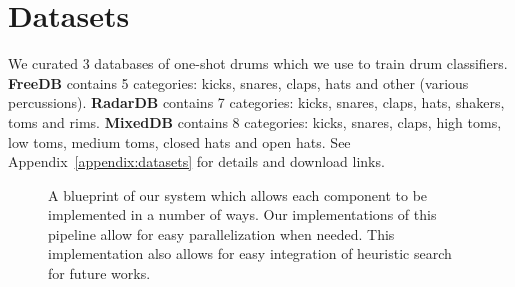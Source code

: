 \documentclass[runningheads,a4paper]{llncs}
\begin{document}
\section{Datasets}
We curated 3 databases of one-shot drums which we use to train drum classifiers. \textbf{FreeDB} contains 5 categories: kicks, snares, claps, hats and other (various percussions). \textbf{RadarDB} contains 7 categories: kicks, snares, claps, hats, shakers, toms and rims. \textbf{MixedDB} contains 8 categories: kicks, snares, claps, high toms, low toms, medium toms, closed hats and open hats. See Appendix~\ref{appendix:datasets} for details and download links.   
 \begin{figure}[tbp]
    \begin{center}
    \end{center}
    \caption{A blueprint of our system which allows each component to be implemented in a number of ways. Our implementations of this pipeline allow for easy parallelization when needed. This implementation also allows for easy integration of heuristic search for future works. 
    }
\label{fig:pipeline_outline}
\end{figure}
\end{document}
